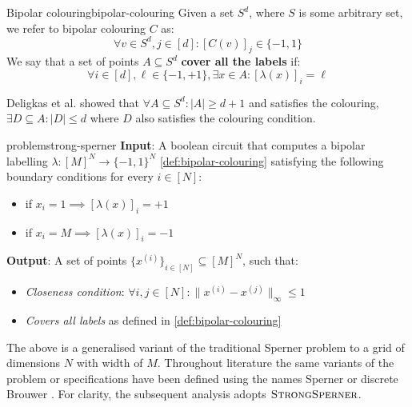 \begin{definitionbox}{Bipolar colouring}{bipolar-colouring}
    Given a set $S^d$, where $S$ is some arbitrary set, we refer
    to bipolar colouring $C$ as:
    $$
        \forall v \in S^d, j \in [d]: [C(v)]_j \in \{-1,1\}
    $$
    We say that a set of points $A \subseteq S^d$ \textbf{cover all the labels} if:
    $$
        \forall i \in [d], \ell \in \{-1, +1\}, \exists x \in A: [\lambda(x)]_{i} = \ell
    $$

\end{definitionbox}

Deligkas et al. \cite{deligkas_PureCircuitTightInapproximability_2024, deligkas_ConstantInapproximabilityPPA_2022} showed that
$\forall A \subseteq S^d: |A| \geq d+1$ and satisfies the colouring, $\exists D \subseteq A: |D| \leq d$ where $D$ also satisfies
the colouring condition.

\begin{definitionbox}{ problem}{strong-sperner}
    \textbf{Input}: A boolean circuit that computes a bipolar labelling $\lambda: [M]^N \to \{-1, 1\}^N$ \ref{def:bipolar-colouring}
    satisfying the following boundary conditions for every $i \in [N]$:
    \begin{itemize}
        \item if $x_i = 1 \implies [\lambda(x)]_i = +1$
        \item if $x_i = M \implies [\lambda(x)]_i = -1$
    \end{itemize}
    \textbf{Output}: A set of points $\{x^{(i)}\}_{i \in [N]} \subseteq [M]^{N}$, such that:
    \begin{itemize}
        \item \textit{Closeness condition}: $\forall i,j \in [N]: \|x^{(i)} - x^{(j)}\|_{\infty} \leq 1$
        \item \textit{Covers all labels} as defined in \ref{def:bipolar-colouring}
    \end{itemize}
\end{definitionbox}


The above is a generalised variant of the traditional Sperner problem to
a grid of dimensions $N$ with width of $M$.
Throughout literature the same variants of the problem or specifications
have been defined using the names Sperner or discrete Brouwer \cite{chen_SettlingComplexityComputing_2009, chen_Complexity2DDiscrete_2009, daskalakis_ComplexityComputingNash_2006, deligkas_PureCircuitTightInapproximability_2024}.
For clarity, the subsequent analysis adopts $\textsc{StrongSperner}$.

